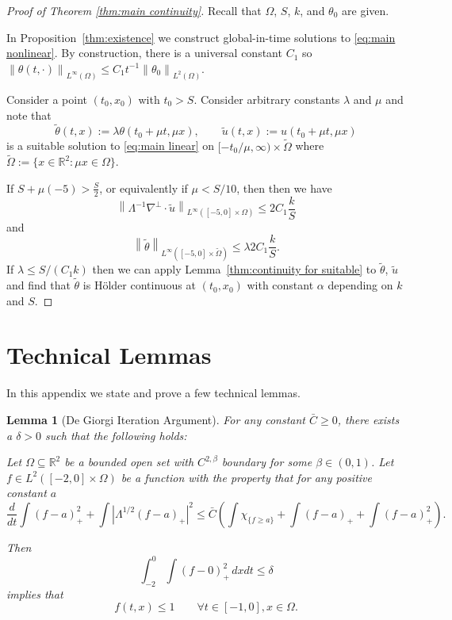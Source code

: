 \documentclass[11pt]{amsart}
\newtheorem{lemma}[theorem]{Lemma}
\theoremstyle{remark}
\theoremstyle{definition}
\newcommand{\R}{\mathbb{R}}
\newcommand{\norm}[1]{\left\lVert#1\right\rVert}
\newcommand{\paren}[1]{\left( #1 \right)}
\newcommand{\abs}[1]{\left\lvert #1 \right\rvert}
\newcommand{\grad}{\nabla}
\newcommand{\ddt}{\frac{d}{dt}}
\newcommand{\n}{^{-1}}
\newcommand{\indic}[1]{\chi_{\{#1\}}}
\begin{document}
\begin{proof}[Proof of Theorem \ref{thm:main continuity}]
Recall that $\Omega$, $S$, $k$, and $\theta_0$ are given.  

In Proposition~\ref{thm:existence} we construct global-in-time solutions to \eqref{eq:main nonlinear}.  By construction, there is a universal constant $C_1$ so $\norm{\theta(t,\cdot)}_{L^\infty(\Omega)} \leq C_1 t\n \norm{\theta_0}_{L^2(\Omega)}$.  

Consider a point $(t_0, x_0)$ with $t_0 > S$.  Consider arbitrary constants $\lambda$ and $\mu$ and note that
\[ \tilde{\theta}(t,x) := \lambda \theta(t_0 + \mu t, \mu x), \qquad \tilde{u}(t,x) := u(t_0 + \mu t, \mu x) \]
is a suitable solution to \eqref{eq:main linear} on $[-t_0/\mu,\infty) \times \tilde{\Omega}$ where $\tilde{\Omega} := \{x\in \R^2: \mu x \in \Omega \}$.  

If $S + \mu (-5) > \frac{S}{2}$, or equivalently if $\mu < S/10$, then then we have 
\[ \norm{\Lambda^{-1} \grad^\perp \cdot \tilde{u}}_{L^\infty([-5,0]\times\Omega)} \leq 2 C_1 \frac{k}{S} \]
and
\[ \norm{\tilde{\theta}}_{L^\infty([-5,0]\times\tilde{\Omega})} \leq \lambda 2 C_1 \frac{k}{S}. \]
If $\lambda \leq S / (C_1 k)$ then we can apply Lemma~\ref{thm:continuity for suitable} to $\tilde{\theta}$, $\tilde{u}$ and find that $\tilde{\theta}$ is H\"{o}lder continuous at $(t_0,x_0)$ with constant $\alpha$ depending on $k$ and $S$.  

\end{proof}


\vskip1cm
\appendix
\section{Technical Lemmas} \label{sec:technical}

In this appendix we state and prove a few technical lemmas.  

\begin{lemma}[De Giorgi Iteration Argument] \label{thm:DG1 skeleton}
For any constant $\bar{C} \geq 0$, there exists a $\delta>0$ such that the following holds:

Let $\Omega \subseteq \R^2$ be a bounded open set with $C^{2,\beta}$ boundary for some $\beta \in (0,1)$.  
Let $f \in L^2([-2,0]\times\Omega)$ be a function with the property that for any positive constant $a$
\begin{equation} \label{DG energy ddt} \ddt \int (f-a)_+^2 + \int \abs{\Lambda^{1/2} (f-a)_+}^2 \leq \bar{C} \paren{ \int \indic{f \geq a} + \int (f-a)_+ + \int (f-a)_+^2 }. \end{equation}

Then
\[ \int_{-2}^0 \int (f-0)_+^2 \,dxdt \leq \delta \]
implies that
\[ f(t,x) \leq 1 \qquad \forall t\in[-1,0], x \in \Omega. \]
\end{lemma}
\end{document}
